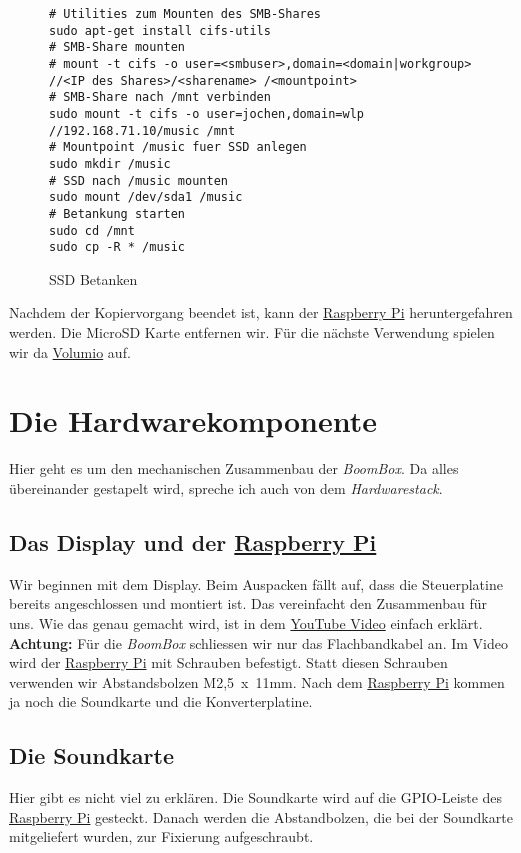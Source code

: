 \documentclass[12pt,a4paper]{article}
\newcommand{\bb}{\textit{BoomBox}}
\newcommand{\rpi}{\href{https://www.raspberrypi.org/}{Raspberry Pi}}
\newcommand{\vol}{\href{https://volumio.org/}{Volumio}}
\begin{document}
\begin{figure}[H]
\begin{lstlisting}
# Utilities zum Mounten des SMB-Shares
sudo apt-get install cifs-utils
# SMB-Share mounten
# mount -t cifs -o user=<smbuser>,domain=<domain|workgroup> //<IP des Shares>/<sharename> /<mountpoint>
# SMB-Share nach /mnt verbinden
sudo mount -t cifs -o user=jochen,domain=wlp //192.168.71.10/music /mnt
# Mountpoint /music fuer SSD anlegen
sudo mkdir /music
# SSD nach /music mounten
sudo mount /dev/sda1 /music
# Betankung starten
sudo cd /mnt
sudo cp -R * /music
\end{lstlisting}
\caption{SSD Betanken}\label{fig:SSD Betanken}
\end{figure}

Nachdem der Kopiervorgang beendet ist, kann der \rpi{} heruntergefahren werden. Die MicroSD Karte entfernen wir. Für die nächste Verwendung spielen wir da
\vol{} auf.

\newpage
\section{Die Hardwarekomponente}
Hier geht es um den mechanischen Zusammenbau der \bb{}. Da alles übereinander gestapelt wird, spreche ich auch von dem \textit{Hardwarestack}.

\subsection{Das Display und der \rpi{}}
Wir beginnen mit dem Display. Beim Auspacken fällt auf, dass die Steuerplatine bereits angeschlossen und montiert ist. Das vereinfacht den Zusammenbau für uns.
Wie das genau gemacht wird, ist in dem \href{https://www.youtube.com/watch?v=tK-w-wDvRTg}{YouTube Video} einfach erklärt. \textbf{Achtung:} Für die \bb{}
schliessen wir nur das Flachbandkabel an. Im Video wird der \rpi{} mit Schrauben befestigt. Statt diesen Schrauben verwenden wir Abstandsbolzen M2,5~x~11mm.
Nach dem \rpi{} kommen ja noch die Soundkarte und die Konverterplatine.

\subsection{Die Soundkarte}
Hier gibt es nicht viel zu erklären. Die Soundkarte wird auf die GPIO-Leiste des \rpi{} gesteckt. Danach werden die Abstandbolzen, die bei der Soundkarte
mitgeliefert wurden, zur Fixierung aufgeschraubt.
\end{document}
